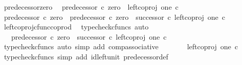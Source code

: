 \begin{isabellebody}
\ predecessor{\isacharunderscore}{\kern0pt}zero{\isacharcolon}{\kern0pt}\isanewline
\ \ {\isachardoublequoteopen}predecessor\ {\isasymcirc}\isactrlsub c\ zero\ {\isacharequal}{\kern0pt}\ left{\isacharunderscore}{\kern0pt}coproj\ one\ {\isasymnat}\isactrlsub c{\isachardoublequoteclose}\isanewline
%
\isadelimproof
%
\endisadelimproof
%
\isatagproof
{}\isamarkupfalse%
\ {\isacharminus}{\kern0pt}\isanewline
\ \ \isamarkupfalse%
\ {\isachardoublequoteopen}predecessor\ {\isasymcirc}\isactrlsub c\ zero\ {\isacharequal}{\kern0pt}\ predecessor\ {\isasymcirc}\isactrlsub c\ {\isacharparenleft}{\kern0pt}zero\ {\isasymamalg}\ successor{\isacharparenright}{\kern0pt}\ {\isasymcirc}\isactrlsub c\ left{\isacharunderscore}{\kern0pt}coproj\ one\ {\isasymnat}\isactrlsub c{\isachardoublequoteclose}\isanewline
\ \ \ \ \isamarkupfalse%
\ left{\isacharunderscore}{\kern0pt}coproj{\isacharunderscore}{\kern0pt}cfunc{\isacharunderscore}{\kern0pt}coprod\ \isamarkupfalse%
\ {\isacharparenleft}{\kern0pt}typecheck{\isacharunderscore}{\kern0pt}cfuncs{\isacharcomma}{\kern0pt}\ auto{\isacharparenright}{\kern0pt}\isanewline
\ \ \isamarkupfalse%
\ \isamarkupfalse%
\ {\isachardoublequoteopen}{\isachardot}{\kern0pt}{\isachardot}{\kern0pt}{\isachardot}{\kern0pt}\ {\isacharequal}{\kern0pt}\ {\isacharparenleft}{\kern0pt}predecessor\ {\isasymcirc}\isactrlsub c\ {\isacharparenleft}{\kern0pt}zero\ {\isasymamalg}\ successor{\isacharparenright}{\kern0pt}{\isacharparenright}{\kern0pt}\ {\isasymcirc}\isactrlsub c\ left{\isacharunderscore}{\kern0pt}coproj\ one\ {\isasymnat}\isactrlsub c{\isachardoublequoteclose}\isanewline
\ \ \ \ \isamarkupfalse%
\ {\isacharparenleft}{\kern0pt}typecheck{\isacharunderscore}{\kern0pt}cfuncs{\isacharcomma}{\kern0pt}\ auto\ simp\ add{\isacharcolon}{\kern0pt}\ comp{\isacharunderscore}{\kern0pt}associative{}{\isacharparenright}{\kern0pt}\isanewline
\ \ \isamarkupfalse%
\ \isamarkupfalse%
\ {\isachardoublequoteopen}{\isachardot}{\kern0pt}{\isachardot}{\kern0pt}{\isachardot}{\kern0pt}\ {\isacharequal}{\kern0pt}\ left{\isacharunderscore}{\kern0pt}coproj\ one\ {\isasymnat}\isactrlsub c{\isachardoublequoteclose}\isanewline
\ \ \ \ \isamarkupfalse%
\ {\isacharparenleft}{\kern0pt}typecheck{\isacharunderscore}{\kern0pt}cfuncs{\isacharcomma}{\kern0pt}\ simp\ add{\isacharcolon}{\kern0pt}\ id{\isacharunderscore}{\kern0pt}left{\isacharunderscore}{\kern0pt}unit{}\ predecessor{\isacharunderscore}{\kern0pt}def{}{\isacharparenright}{\kern0pt}\isanewline

\end{isabellebody}
